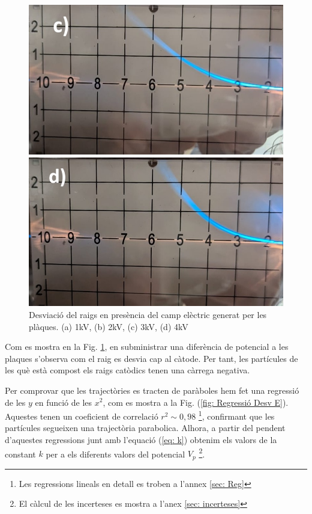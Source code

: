 \documentclass[11pt]{article}
\begin{document}
\begin{figure}[h]
\begin{minipage}{0.38\textwidth}
        \includegraphics[width=\textwidth]{3kV.jpg}
    \end{minipage}
    \begin{minipage}{0.38\textwidth}
        \centering
        \includegraphics[width=\textwidth]{4kV.jpg}
    \end{minipage}
    \caption{Desviació del raigs en presència del camp elèctric generat per les plàques. (a) 1kV, (b) 2kV, (c) 3kV, (d) 4kV}
    \label{fig: Desv E}
\end{figure}

Com es mostra en la Fig. \ref{fig: Desv E}, en subministrar una diferència de potencial a les plaques s'observa com el raig es desvia cap al càtode. Per tant, les partícules de les què està compost els raigs catòdics tenen una càrrega negativa.

 Per comprovar que les trajectòries es tracten de paràboles hem fet una regressió de les $y$ en funció de les $x^2$, com es mostra a la Fig. (\ref{fig: Regressió Desv E}). Aquestes tenen un coeficient de correlació $r^2 \sim 0,98$ \footnote{Les regressions lineals en detall es troben a l'annex \ref{sec: Reg}}, confirmant que les partícules segueixen una trajectòria parabolica. Alhora, a partir del pendent d'aquestes regressions junt amb l'equació (\ref{eq: k}) obtenim els valors de la constant $k$ per a els diferents valors del potencial $V_p$ \footnote{El càlcul de les incerteses es mostra a l'anex \ref{sec: incerteses}}.
 
\end{document}
